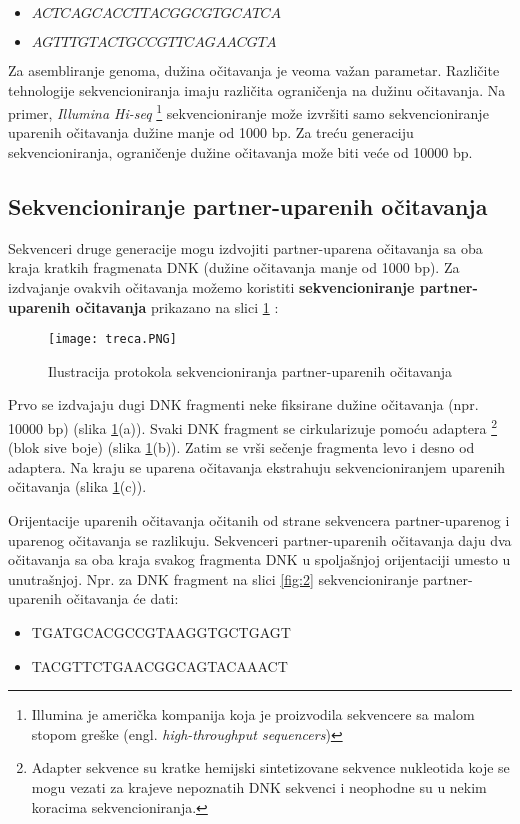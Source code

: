 \documentclass[12pt,oneside]{memoir}
\begin{document}
\begin{itemize}
    \item {$ACTCAGCACCTTACGGCGTGCATCA$}
    \item {$AGTTTGTACTGCCGTTCAGAACGTA$}
\end{itemize}

Za asembliranje genoma, dužina očitavanja je veoma važan parametar. Različite tehnologije sekvencioniranja imaju različita ograničenja na dužinu očitavanja. Na primer, \textit{Illumina Hi-seq} \footnote{Illumina je američka kompanija koja je proizvodila sekvencere sa malom stopom greške (engl. \textit{high-throughput sequencers})} sekvencioniranje može izvršiti samo sekvencioniranje uparenih očitavanja dužine manje od 1000 bp. Za treću generaciju sekvencioniranja, ograničenje dužine očitavanja može biti veće od 10000 bp.

\newpage

\subsection{Sekvencioniranje partner-uparenih očitavanja}

Sekvenceri druge generacije mogu izdvojiti partner-uparena očitavanja sa oba kraja kratkih fragmenata DNK (dužine očitavanja manje od 1000 bp). Za izdvajanje ovakvih očitavanja možemo koristiti \textbf{sekvencioniranje partner-uparenih očitavanja} prikazano na slici \ref{fig:3} :

\begin{figure}[!ht]
  \centering
  \texttt{[image: treca.PNG]}
  \caption{Ilustracija protokola sekvencioniranja partner-uparenih očitavanja}
\label{fig:3}
\end{figure}

 Prvo se izdvajaju dugi DNK fragmenti neke fiksirane dužine očitavanja (npr. 10000 bp) (slika \ref{fig:3}(a)). Svaki DNK fragment se cirkularizuje pomoću adaptera \footnote{Adapter sekvence su kratke hemijski sintetizovane sekvence
nukleotida koje se mogu vezati za krajeve nepoznatih DNK sekvenci i neophodne su u nekim koracima sekvencioniranja.} (blok sive boje) (slika \ref{fig:3}(b)). Zatim se vrši sečenje fragmenta levo i desno od adaptera. Na kraju se uparena očitavanja ekstrahuju sekvencioniranjem uparenih očitavanja (slika \ref{fig:3}(c)).

Orijentacije uparenih očitavanja očitanih od strane sekvencera partner-uparenog i uparenog očitavanja se razlikuju. Sekvenceri partner-uparenih očitavanja daju dva očitavanja sa oba kraja svakog fragmenta DNK u spoljašnjoj orijentaciji umesto u unutrašnjoj. Npr. za DNK fragment na slici \ref{fig:2} sekvencioniranje partner-uparenih očitavanja će dati:
\begin{itemize}
    \item {TGATGCACGCCGTAAGGTGCTGAGT}
    \item {TACGTTCTGAACGGCAGTACAAACT}
\end{itemize}
\end{document}
